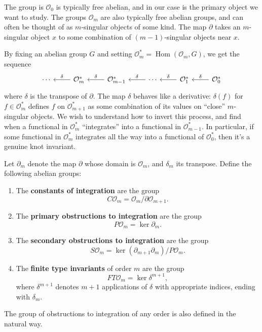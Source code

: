 The group is \(\mathcal{O}_{0}\) is typically free abelian, and in our case is the primary object we want to study. The groups \(\mathcal{O}_{m}\) are also typically free abelian groups, and can often be thought of as \(m\)-singular objects of some kind. The map \(\partial\) takes an \(m\)-singular object \(x\) to some combination of \((m - 1)\)-singular objects near \(x\).

By fixing an abelian group \(G\) and setting \(\mathcal{O}_{m}^{\ast} = \operatorname{Hom}(\mathcal{O}_{m}, G)\), we get the sequence
\[\begin{tikzcd}
	\cdots & {\mathcal{O}_{m}^{\ast}} & {\mathcal{O}_{m - 1}^{\ast}} & \cdots & {\mathcal{O}_{1}^{\ast}} & {\mathcal{O}_{0}^{\ast}}
	\arrow["\delta"', from=1-2, to=1-1]
	\arrow["\delta"', from=1-3, to=1-2]
	\arrow["\delta"', from=1-4, to=1-3]
	\arrow["\delta"', from=1-5, to=1-4]
	\arrow["\delta"', from=1-6, to=1-5]
\end{tikzcd}\]
where \(\delta\) is the transpose of \(\partial\). The map \(\delta\) behaves like a derivative: \(\delta(f)\) for \(f \in \mathcal{O}_{m}^{\ast}\) defines \(f\) on \(\mathcal{O}_{m + 1}^{\ast}\) as some combination of its values on ``close'' \(m\)-singular objects. We wish to understand how to invert this process, and find when a functional in \(\mathcal{O}_{m}^{\ast}\) ``integrates'' into a functional in \(\mathcal{O}_{m - 1}^{\ast}\). In particular, if some functional in \(\mathcal{O}_{m}^{\ast}\) integrates all the way into a functional of \(\mathcal{O}_{0}^{\ast}\), then it's a genuine knot invariant.

\begin{definitions} Let \(\partial_{m}\) denote the map \(\partial\) whose domain is \(\mathcal{O}_{m}\), and \(\delta_{m}\) its transpose. Define the following abelian groups:
	\begin{enumerate}
		\item The \textbf{constants of integration} are the group
			\[C\mathcal{O}_{m} = \mathcal{O}_{m} / \partial \mathcal{O}_{m + 1}.\]
		\item The \textbf{primary obstructions to integration} are the group
			\[P\mathcal{O}_{m} = \ker{\partial_{m}}.\]
		\item The \textbf{secondary obstructions to integration} are the group
			\[S\mathcal{O}_{m} = \ker{(\partial_{m + 1}\partial_{m})} / P\mathcal{O}_{m}.\]
		\item The \textbf{finite type invariants} of order \(m\) are the group
			\[FT\mathcal{O}_{m} = \ker \delta^{m + 1},\]
			where \(\delta^{m + 1}\) denotes \(m + 1\) applications of \(\delta\) with appropriate indices, ending with \(\delta_{m}\).

	\end{enumerate}
\end{definitions}
The group of obstructions to integration of any order is also defined in the natural way.

